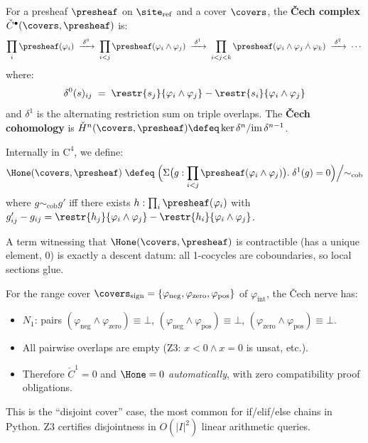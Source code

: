 \begin{definition}
\label{def:cech-complex-ref}
For a presheaf $\presheaf$ on $\site_{\mathrm{ref}}$ and a cover $\covers$,
the \textbf{\v{C}ech complex} $\check{C}^\bullet(\covers, \presheaf)$ is:
\[
  \prod_i \presheaf(\varphi_i)
  \;\xrightarrow{\;\delta^0\;}\;
  \prod_{i < j} \presheaf(\varphi_i \wedge \varphi_j)
  \;\xrightarrow{\;\delta^1\;}\;
  \prod_{i < j < k}
    \presheaf(\varphi_i \wedge \varphi_j \wedge \varphi_k)
  \;\xrightarrow{\;\delta^2\;}\; \cdots
\]
where:
\[
  \delta^0(s)_{ij} \;=\;
  \restr{s_j}{\varphi_i \wedge \varphi_j} -
  \restr{s_i}{\varphi_i \wedge \varphi_j}
\]
and $\delta^1$ is the alternating restriction sum on triple overlaps.
The \textbf{\v{C}ech cohomology} is
$\check{H}^n(\covers, \presheaf) \defeq \ker \delta^n / \mathrm{im}\,
\delta^{n-1}$.
\end{definition}

\begin{definition}
\label{def:h1-type-ref}
Internally in $\mathrm{C}^4$, we define:
\[
  \Hone(\covers, \presheaf) \;\defeq\;
  \Bigl(\Sigma\bigl(g : \prod_{i<j}
    \presheaf(\varphi_i \wedge \varphi_j)\bigr).\;
  \delta^1(g) = 0\Bigr) \Big/ {\sim_{\mathrm{cob}}}
\]
where $g \sim_{\mathrm{cob}} g'$ iff there exists
$h : \prod_i \presheaf(\varphi_i)$ with
$g'_{ij} - g_{ij} = \restr{h_j}{\varphi_i \wedge \varphi_j} -
\restr{h_i}{\varphi_i \wedge \varphi_j}$.

A term witnessing that $\Hone(\covers, \presheaf)$ is contractible (has a
unique element, $0$) is exactly a descent datum: all 1-cocycles are
coboundaries, so local sections glue.
\end{definition}

\begin{example}
For the range cover $\covers_{\mathrm{sign}} =
\{\varphi_{\mathrm{neg}}, \varphi_{\mathrm{zero}}, \varphi_{\mathrm{pos}}\}$
of $\varphi_{\mathrm{int}}$, the \v{C}ech nerve has:
\begin{itemize}
\item $N_1$: pairs $(\varphi_{\mathrm{neg}} \wedge \varphi_{\mathrm{zero}})
  \equiv \bot$,
  $(\varphi_{\mathrm{neg}} \wedge \varphi_{\mathrm{pos}}) \equiv \bot$,
  $(\varphi_{\mathrm{zero}} \wedge \varphi_{\mathrm{pos}}) \equiv \bot$.
\item All pairwise overlaps are empty (Z3: $x<0 \wedge x=0$ is unsat,
  etc.).
\item Therefore $\check{C}^1 = 0$ and $\Hone = 0$ \emph{automatically},
  with zero compatibility proof obligations.
\end{itemize}
This is the ``disjoint cover'' case, the most common for if/elif/else
chains in Python.  Z3 certifies disjointness in $O(|I|^2)$ linear
arithmetic queries.
\end{example}


